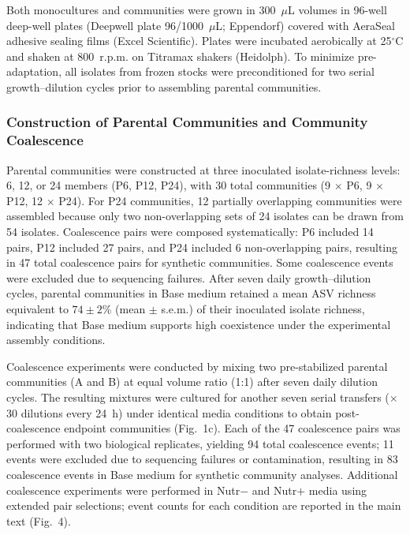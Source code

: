 Both monocultures and communities were grown in 300~$\mu$L volumes in 96-well deep-well plates (Deepwell plate 96/1000~$\mu$L; Eppendorf) covered with AeraSeal adhesive sealing films (Excel Scientific). Plates were incubated aerobically at 25$^\circ$C and shaken at 800~r.p.m. on Titramax shakers (Heidolph). To minimize pre-adaptation, all isolates from frozen stocks were preconditioned for two serial growth--dilution cycles prior to assembling parental communities.


\subsubsection*{Construction of Parental Communities and Community Coalescence}
\label{sec:suppl:coalescence}

Parental communities were constructed at three inoculated isolate-richness levels: 6, 12, or 24 members (P6, P12, P24), with 30 total communities (9 $\times$ P6, 9 $\times$ P12, 12 $\times$ P24). For P24 communities, 12 partially overlapping communities were assembled because only two non-overlapping sets of 24 isolates can be drawn from 54 isolates. Coalescence pairs were composed systematically: P6 included 14 pairs, P12 included 27 pairs, and P24 included 6 non-overlapping pairs, resulting in 47 total coalescence pairs for synthetic communities. Some coalescence events were excluded due to sequencing failures. After seven daily growth--dilution cycles, parental communities in Base medium retained a mean ASV richness equivalent to $74 \pm 2$\% (mean $\pm$ s.e.m.) of their inoculated isolate richness, indicating that Base medium supports high coexistence under the experimental assembly conditions.

Coalescence experiments were conducted by mixing two pre-stabilized parental communities (A and B) at equal volume ratio (1:1) after seven daily dilution cycles. The resulting mixtures were cultured for another seven serial transfers ($\times$30 dilutions every 24~h) under identical media conditions to obtain post-coalescence endpoint communities (Fig.~1c). Each of the 47 coalescence pairs was performed with two biological replicates, yielding 94 total coalescence events; 11 events were excluded due to sequencing failures or contamination, resulting in 83 coalescence events in Base medium for synthetic community analyses. Additional coalescence experiments were performed in Nutr$-$ and Nutr$+$ media using extended pair selections; event counts for each condition are reported in the main text (Fig.~4).


